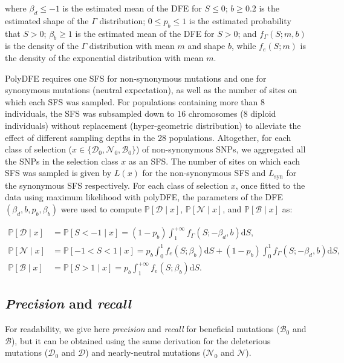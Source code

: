 \documentclass{article}
\newcommand{\der}{\text{d}}
\newcommand{\proba}{\mathbb{P}}
\newcommand{\SphyDel}{\mathcal{D}_0}
\newcommand{\SphyNeu}{\mathcal{N}_0}
\newcommand{\SphyBen}{\mathcal{B}_0}
\newcommand{\Sphyclass}{x}
\newcommand{\given}{\mid}
\newcommand{\Spop}{S}
\newcommand{\SpopDel}{\mathcal{D}}
\newcommand{\SpopNeu}{\mathcal{N}}
\newcommand{\SpopBen}{\mathcal{B}}
\newcommand{\AdvMean}{\beta_b}
\newcommand{\DelMean}{\beta_d}
\begin{document}
    where $\DelMean \leq -1 $ is the estimated mean of the DFE for $\Spop \leq 0$;
    $b \geq 0.2$ is the estimated shape of the $\Gamma$ distribution;
    $0 \leq p_b \leq 1$ is the estimated probability that $\Spop > 0$;
    $\AdvMean \geq 1$ is the estimated mean of the DFE for $\Spop > 0$;
    and $f_{\Gamma}(\Spop; m, b)$ is the density of the $\Gamma$ distribution with mean $m$ and shape $b$, while $f_{e}(\Spop; m)$ is the density of the exponential distribution with mean $m$.

    PolyDFE requires one SFS for non-synonymous mutations and one for synonymous mutations (neutral expectation), as well as the number of sites on which each SFS was sampled.
    For populations containing more than $8$ individuals, the SFS was subsampled down to $16$ chromosomes ($8$ diploid individuals) without replacement (hyper-geometric distribution) to alleviate the effect of different sampling depths in the 28 populations.
    Altogether, for each class of selection ($\Sphyclass \in \{\SphyDel, \SphyNeu, \SphyBen \}$) of non-synonymous SNPs, we aggregated all the SNPs in the selection class $\Sphyclass$ as an SFS.
    The number of sites on which each SFS was sampled is given by $L(\Sphyclass)$ for the non-synonymous SFS and $L_{\text{syn}}$ for the synonymous SFS respectively.
    For each class of selection $\Sphyclass$, once fitted to the data using maximum likelihood with polyDFE, the parameters of the DFE $\left( \DelMean , b, p_b, \AdvMean \right)$ were used to compute $\proba [ \SpopDel \given  \Sphyclass] $, $\proba [ \SpopNeu \given \Sphyclass]$, and $\proba [ \SpopBen \given \Sphyclass]$ as:

    \begin{align}
        \proba [ \SpopDel \given  \Sphyclass] &= \proba [ \Spop < -1 \given \Sphyclass ] = \left( 1 - p_b \right) \int_{1}^{+\infty} f_{\Gamma}(\Spop; -\DelMean, b) \der \Spop, \label{eq:polyProbaDel} \\
        \proba [ \SpopNeu \given \Sphyclass] &= \proba [ -1 < \Spop < 1 \given \Sphyclass ] = p_b \int_{0}^{1} f_{e}(\Spop; \AdvMean) \der \Spop + \left( 1 - p_b \right) \int_{0}^{1} f_{\Gamma}(\Spop; -\DelMean, b) \der \Spop, \\
        \proba [ \SpopBen \given \Sphyclass] &= \proba [ \Spop > 1 \given \Sphyclass] = p_b \int_{1}^{+\infty} f_{e}(\Spop; \AdvMean) \der \Spop. \label{eq:polyProbaAdv}
    \end{align}

    \subsection{\textit{Precision} and \textit{recall}}
    \label{subsec:precisison_recall}
    For readability, we give here \textit{precision} and \textit{recall} for beneficial mutations ($\SphyBen$ and $\SpopBen$), but it can be obtained using the same derivation for the deleterious mutations ($\SphyDel$ and $\SpopDel$) and nearly-neutral mutations ($\SphyNeu$ and $\SpopNeu$).
\end{document}
